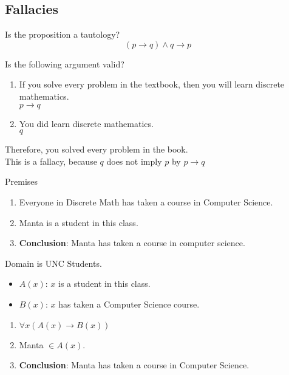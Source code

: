 \documentclass[a4paper, 12pt]{article}
\newenvironment{example}[1][Example]{\begin{trivlist}
\item[\hskip \labelsep {\bfseries #1}]}{\end{trivlist}}
\newcommand{\keyword}[1]{\textbf{#1}}
\newcommand{\then}{\rightarrow}
\begin{document}
    \subsection*{Fallacies}
    Is the proposition a tautology?
    \[(p \then q) \wedge q \then p\]
    \begin{example}
        Is the following argument valid?
        \begin{enumerate}
            \item If you solve every problem in the textbook, then you will learn discrete
            mathematics. \\
            $p \then q$
            \item You did learn discrete mathematics. \\
            $q$
        \end{enumerate}
        Therefore, you solved every problem in the book. \\
        This is a fallacy, because $q$ does not imply $p$ by $p \then q$
    \end{example}
    \begin{example}
        Premises
        \begin{enumerate}
            \item Everyone in Discrete Math has taken a course in Computer Science.
            \item Manta is a student in this class.
            \item \keyword{Conclusion}: Manta has taken a course in computer science.
        \end{enumerate}
        Domain is UNC Students. \\
        \begin{itemize}
            \item $A(x)$: $x$ is a student in this class.
            \item $B(x)$: $x$ has taken a Computer Science course.
        \end{itemize}
        \begin{enumerate}
            \item $\forall x (A(x) \then B(x))$
            \item Manta $\in A(x)$.
            \item \keyword{Conclusion}: Manta has taken a course in Computer Science.
        \end{enumerate}
    \end{example}
\end{document}
